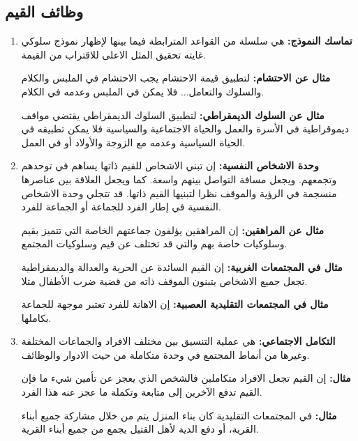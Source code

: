 \subsection{وظائف القيم}
\begin{enumerate}
    \item\textbf{تماسك النموذج:}
        هي سلسلة من القواعد المترابطة فيما بينها لإظهار نموذج سلوكي غايته تحقيق
        المثل الاعلى للاقتراب من القيمة.
        \medskip
        
        \textbf{مثال عن الاحتشام:}
        لتطبيق قيمة الاحتشام يجب الاحتشام في الملبس والكلام والسلوك والتعامل...
        فلا يمكن في الملبس وعدمه في الكلام.
        \medskip
        
        \textbf{مثال عن السلوك الديمقراطي:}
        لتطبيق السلوك الديمقراطي يقتضي مواقف ديموقراطية في الأسرة والعمل والحياة
        الاجتماعية والسياسية فلا يمكن تطبيقه في الحياة السياسية وعدمه مع الزوجة
        والأولاد أو في العمل.
    \item\textbf{وحدة الاشخاص النفسية:}
        إن تبني الاشخاص للقيم ذاتها يساهم في توحدهم وتجمعهم. ويجعل مسافة التواصل
        بينهم واسعة. كما ويجعل العلاقة بين عناصرها منسجمة في الرؤية والموقف نظرا
        لتبنيها القيم ذاتها. قد تتجلي وحدة الاشخاص النفسية في إطار الفرد للجماعة
        أو الجماعة للفرد.
        \medskip
        
        \textbf{مثال عن المراهقين:}
        إن المراهقين يؤلفون جماعتهم الخاصة التي تتميز بقيم وسلوكيات خاصة بهم
        والتي قد تختلف عن قيم وسلوكيات المجتمع.
        \medskip
        
        \textbf{مثال في المجتمعات الغربية:}
        إن القيم السائدة عن الحرية والعدالة والديمقراطية تجعل جميع الاشخاص يتبنون
        الموقف ذاته من قضية ضرب الأطفال مثلا.
        \medskip
        
        \textbf{مثال في المجتمعات التقليدية العصبية:}
        إن الاهانة للفرد تعتبر موجهة للجماعة بكاملها.
    \item\textbf{التكامل الاجتماعي:}
        هي عملية التنسيق بين مختلف الافراد والجماعات المختلفة وغيرها من أنماط
        المجتمع في وحدة متكاملة من حيث الادوار والوظائف.
        \smallskip
        
        \textbf{مثال:}
        إن القيم تجعل الافراد متكاملين فالشخص الذي يعجز عن تأمين شيء ما فإن القيم
        تدفع الآخرين إلى متابعة وتكملة ما عجز عنه هذا الفرد.
        \smallskip
        
        \textbf{مثال:}
        في المجتمعات التقليدية كان بناء المنزل يتم من خلال مشاركة جميع أبناء
        القرية، أو دفع الدية لأهل القتيل يجمع من جميع أبناء القرية.
\end{enumerate}

